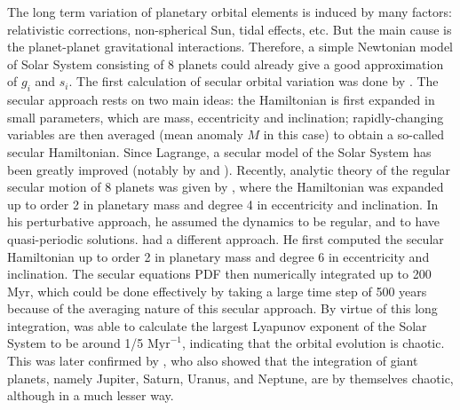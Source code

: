 \documentclass[12pt]{article}
\newcounter{para}[subsection]
\begin{document}
	
	The long term variation of planetary orbital elements is induced by many factors: relativistic corrections, non-spherical Sun, tidal effects, etc. But the main cause is the planet-planet gravitational interactions. Therefore, a simple Newtonian model of Solar System consisting of 8 planets could already give a good approximation of $g_i$ and $s_i$.
	The first calculation of secular orbital variation was done by \cite{lagrange1782theorie}. The secular approach rests on two main ideas: the Hamiltonian is first expanded in small parameters, which are mass, eccentricity and inclination; rapidly-changing variables are then averaged (mean anomaly $M$ in this case) to obtain a so-called secular Hamiltonian. Since Lagrange, a secular model of the Solar System has been greatly improved (notably by \cite{le1856} and \cite{Hill1873}).
	Recently, analytic theory of the regular secular motion of 8 planets was given by \cite{bretagnon1974termes}, where the Hamiltonian was expanded up to order 2 in planetary mass and degree 4 in eccentricity and inclination. In his perturbative approach, he assumed the dynamics to be regular, and to have quasi-periodic solutions.
	\citet{laskar1985} had a different approach. He first computed the secular Hamiltonian up to order 2 in planetary mass and degree 6 in eccentricity and inclination. The secular equations PDF then numerically integrated up to 200 Myr, which could be done effectively by taking a large time step of 500 years because of the averaging nature of this secular approach. By virtue of this long integration, \cite{laskar1989} was able to calculate the largest Lyapunov exponent of the Solar System to be around 1/5 $\text{Myr}^{-1}$, indicating that the orbital evolution is chaotic. This was later confirmed by \cite{sussman1992}, who also showed that the integration of giant planets, namely Jupiter, Saturn, Uranus, and Neptune, are by themselves chaotic, although in a much lesser way.
	
\end{document}
